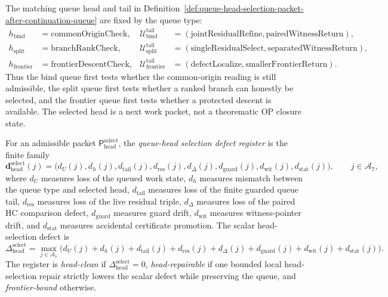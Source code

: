 \begin{definition}
\label{def:continuation-queue-heads-and-finite-tails}
The matching queue head and tail in Definition~\ref{def:queue-head-selection-packet-after-continuation-queue} are fixed by the queue type:
\[
\begin{aligned}
 h_{\mathrm{bind}}
 &= \mathrm{commonOriginCheck},
 &\mathcal U_{\mathrm{bind}}^{\mathrm{tail}}
 &= (\mathrm{jointResidualRefine},\mathrm{pairedWitnessReturn}),\\
 h_{\mathrm{split}}
 &= \mathrm{branchRankCheck},
 &\mathcal U_{\mathrm{split}}^{\mathrm{tail}}
 &= (\mathrm{singleResidualSelect},\mathrm{separatedWitnessReturn}),\\
 h_{\mathrm{frontier}}
 &= \mathrm{frontierDescentCheck},
 &\mathcal U_{\mathrm{frontier}}^{\mathrm{tail}}
 &= (\mathrm{defectLocalize},\mathrm{smallerFrontierReturn}).
\end{aligned}
\]
Thus the bind queue first tests whether the common-origin reading is still admissible, the split queue first tests whether a ranked branch can honestly be selected, and the frontier queue first tests whether a protected descent is available. The selected head is a next work packet, not a theorematic OP closure state.
\end{definition}

\begin{definition}
\label{def:queue-head-selection-defect-register}
For an admissible packet \(\mathsf P_{\mathrm{head}}^{\mathrm{select}}\), the \emph{queue-head selection defect register} is the finite family
\[
 \mathbf d_{\mathrm{head}}^{\mathrm{select}}(j)
 =
 \bigl(d_U(j),d_h(j),d_{\mathrm{tail}}(j),d_{\mathrm{res}}(j),
 d_{\Delta}(j),d_{\mathrm{guard}}(j),d_{\mathrm{wit}}(j),d_{\mathrm{stat}}(j)\bigr),
 \qquad j\in\mathcal A_7,
\]
where \(d_U\) measures loss of the queued work state, \(d_h\) measures mismatch between the queue type and selected head, \(d_{\mathrm{tail}}\) measures loss of the finite guarded queue tail, \(d_{\mathrm{res}}\) measures loss of the live residual triple, \(d_{\Delta}\) measures loss of the paired HC comparison defect, \(d_{\mathrm{guard}}\) measures guard drift, \(d_{\mathrm{wit}}\) measures witness-pointer drift, and \(d_{\mathrm{stat}}\) measures accidental certificate promotion. The scalar head-selection defect is
\[
 \Delta_{\mathrm{head}}^{\mathrm{select}}
 =
 \max_{j\in\mathcal A_7}
 \bigl(d_U(j)+d_h(j)+d_{\mathrm{tail}}(j)+d_{\mathrm{res}}(j)+d_{\Delta}(j)
 +d_{\mathrm{guard}}(j)+d_{\mathrm{wit}}(j)+d_{\mathrm{stat}}(j)\bigr).
\]
The register is \emph{head-clean} if \(\Delta_{\mathrm{head}}^{\mathrm{select}}=0\), \emph{head-repairable} if one bounded local head-selection repair strictly lowers the scalar defect while preserving the queue, and \emph{frontier-bound} otherwise.
\end{definition}

